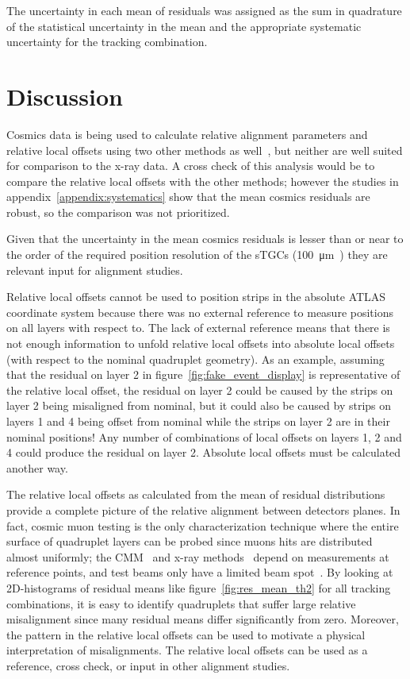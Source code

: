 The uncertainty in each mean of residuals was assigned as the sum in quadrature of the statistical uncertainty in the mean and the appropriate systematic uncertainty for the tracking combination. 

\section{Discussion}

Cosmics data is being used to calculate relative alignment parameters and relative local offsets using two other methods as well~\cite{lefebvre_thesis}, but neither are well suited for comparison to the x-ray data. A cross check of this analysis would be to compare the relative local offsets with the other methods; however the studies in appendix~\ref{appendix:systematics} show that the mean cosmics residuals are robust, so the comparison was not prioritized.

Given that the uncertainty in the mean cosmics residuals is lesser than or near to the order of the required position resolution of the sTGCs (\SI{100}{\micro\meter}~\cite{nsw_tdr}) they are relevant input for alignment studies.

Relative local offsets cannot be used to position strips in the absolute ATLAS coordinate system because there was no external reference to measure positions on all layers with respect to. The lack of external reference means that there is not enough information to unfold relative local offsets into absolute local offsets (with respect to the nominal quadruplet geometry). As an example, assuming that the residual on layer 2 in figure~\ref{fig:fake_event_display} is representative of the relative local offset, the residual on layer 2 could be caused by the strips on layer 2 being misaligned from nominal, but it could also be caused by strips on layers 1 and 4 being offset from nominal while the strips on layer 2 are in their nominal positions! Any number of combinations of local offsets on layers 1, 2 and 4 could produce the residual on layer 2. Absolute local offsets must be calculated another way.

The relative local offsets as calculated from the mean of residual distributions provide a complete picture of the relative alignment between detectors planes. In fact, cosmic muon testing is the only characterization technique where the entire surface of quadruplet layers can be probed since muons hits are distributed almost uniformly; the CMM~\cite{carlson_results_2019} and x-ray methods~\cite{lefebvre_precision_2020} depend on measurements at reference points, and test beams only have a limited beam spot~\cite{abusleme_performance_2016}. By looking at 2D-histograms of residual means like figure~\ref{fig:res_mean_th2} for all tracking combinations, it is easy to identify quadruplets that suffer large relative misalignment since many residual means differ significantly from zero. Moreover, the pattern in the relative local offsets can be used to motivate a physical interpretation of misalignments. The relative local offsets can be used as a reference, cross check, or input in other alignment studies.